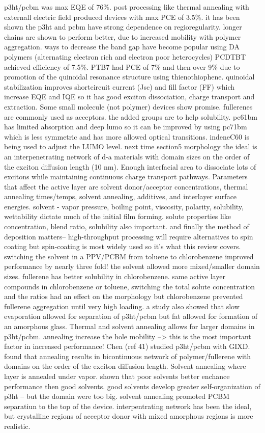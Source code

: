 \documentclass{article}
\begin{document}
p3ht/pcbm was max EQE of 76\%. post processing like thermal annealing with externall electric field produced devices with max PCE of 3.5\%. it has been shown the p3ht and pcbm have strong dependence on regioregularity. longer chains are shown to perform better, due to increased mobility with polymer aggregation.
ways to decrease the band gap have become popular using DA polymers (alternating electron rich and electron poor heterocycles) PCDTBT achieved efficiency of 7.5\%. PTB7 had PCE of 7\% and then over 9\% due to promotion of the quinoidal resonance structure using thienothiophene. quinoidal stabilization improves shortcircuit current (Jsc) and fill factor (FF) which increase EQE and IQE so it has good exciton dissociation, charge transport and extraction.
Some small molecule (not polymer) devices show promise.
fullerenes are commonly used as acceptors. the added groups are to help solubility. pc61bm has limited absorption and deep lumo so it can be improved by using pc71bm which is less symmetric and has more allowed optical transitions. indeneC60 is being used to adjust the LUMO level.
next time section5
morphology
the ideal is an interpenetrating network of d-a materials with domain sizes on the order of the exciton diffusion length (10 nm). Enough interfacial area to dissociate lots of excitons while maintaining continuous charge transport pathways. Parameters that affect the active layer are solvent donor/acceptor concentrations, thermal annealing times/temps, solvent annealing, additives, and interlayer surface energies. 
solvent - vapor pressure, boiling point, viscosity, polarity, solubility, wettability dictate much of the initial film forming. solute properties like concentration, blend ratio, solubility also important. and finally the method of deposition matters-- high-throughput processing will require alternatives to spin coating but spin-coating is most widely used so it's what this review covers.
switching the solvent in a PPV/PCBM from toluene to chlorobenzene improved performance by nearly three fold! the solvent allowed more mixed/smaller domain sizes. fullerene has better solubility in chlorobenzene.
same active layer compounds in chlorobenzene or toluene, switching the total solute concentration and the ratios had an effect on the morphology but chlorobenzene prevented fullerene aggregation until very high loading.
a study also showed that slow evaporation allowed for separation of p3ht/pcbm but fat allowed for formation of an amorphous glass.
Thermal and solvent annealing allows for larger domains in p3ht/pcbm. annealing increase the hole mobility --> this is the most important factor in increased performance!
Chen (ref 41) studied p3ht/pcbm with GIXD. found that annealing results in bicontinuous network of polymer/fullerene with domains on the order of the exciton diffusion length.
Solvent annealing where layer is annealed under vapor. shown that poor solvents better enchance performance then good solvents. good solvents develop greater self-organization of p3ht -- but the domain were too big. solvent annealing promoted PCBM separatiun to the top of the device.
interpentrating network has been the ideal, but crystalline regions of acceptor donor with mixed amorphous regions is more realistic.
\end{document}
